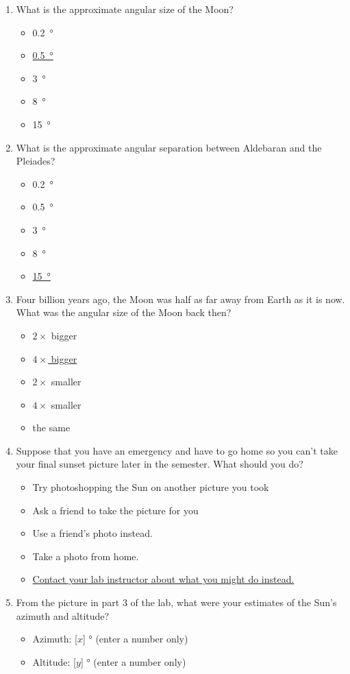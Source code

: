 \documentclass[12pt]{article}
\begin{document}
\begin{enumerate}
\item
What is the approximate angular size of the Moon?
\begin{itemize}
    \item \SI{0.2}{\degree}
    \item \underline{\SI{0.5}{\degree}}
    \item \SI{3}{\degree}
    \item \SI{8}{\degree}
    \item \SI{15}{\degree}
\end{itemize}
\item
What is the approximate angular separation between Aldebaran and the Pleiades?
\begin{itemize}
    \item \SI{0.2}{\degree}
    \item \SI{0.5}{\degree}
    \item \SI{3}{\degree}
    \item \SI{8}{\degree}
    \item \underline{\SI{15}{\degree}}
\end{itemize}
\item
Four billion years ago, the Moon was half as far away from Earth as it is now. What was the angular size of the Moon back then?
\begin{itemize}
    \item $2\times$ bigger
    \item \underline{$4\times$ bigger}
    \item $2\times$ smaller
    \item $4\times$ smaller
    \item the same 
\end{itemize}
\item
Suppose that you have an emergency and have to go home so you can't take your final sunset picture later in the semester. What should you do?
\begin{itemize}
    \item Try photoshopping the Sun on another picture you took
    \item Ask a friend to take the picture for you
    \item Use a friend's photo instead.
    \item Take a photo from home.
    \item \underline{Contact your lab instructor about what you might do instead.}
\end{itemize}
\item%
From the picture in part 3 of the lab, what were your estimates of the Sun's azimuth and altitude?
\begin{itemize}
    \item Azimuth: [$x$] \si{\degree} (enter a number only)
    \item Altitude: [$y$] \si{\degree} (enter a number only)
\end{itemize}
\end{enumerate}
\end{document}
